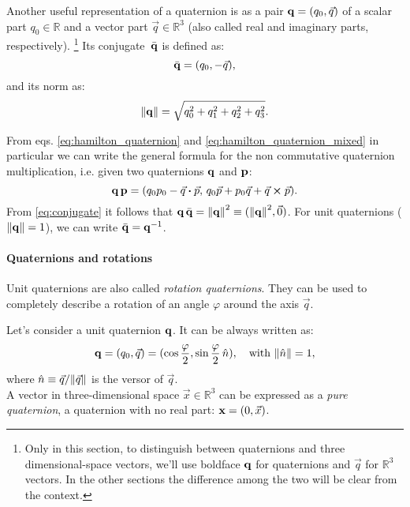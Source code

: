 Another useful representation of a quaternion is as a pair $\mathbf{q} = (q_0, \vec q)$ of a scalar part $q_0\in \mathbb{R}$ and a vector part $\vec q \in \mathbb{R}^3$ (also called real and imaginary parts, respectively).
\footnote{Only in this section, to distinguish between quaternions and three dimensional-space vectors, we'll use boldface $\mathbf{q}$ for quaternions and $\vec q$ for $\mathbb{R}^3$ vectors. In the other sections the difference among the two will be clear from the context.}
Its conjugate~$\bar{\mathbf{q}}$ is defined as:
\begin{equation}
 \bar{\mathbf{q}} = (q_0, -\vec q),
 \label{eq:conjugate}
\end{equation}
and its norm as:
\begin{equation}
 \norm{\mathbf{q}} = \sqrt{q_0^2+q_1^2+q_2^2+q_3^2}.
\end{equation}

From eqs. \eqref{eq:hamilton_quaternion} and \eqref{eq:hamilton_quaternion_mixed} in particular we can write the general formula for the non commutative quaternion multiplication, i.e. given two quaternions $\mathbf{q}$ and $\mathbf{p}$:
\begin{equation}
 \quat{q} \,\quat{p} = (q_0 p_0 - \vec q \vdot \vec p, \, q_0 \vec p + p_0 \vec q + \vec q \cross \vec p).
 \label{eq:quaternion_multiplication}
\end{equation}
From \eqref{eq:conjugate} it follows that $\mathbf{q} \,\bar{\mathbf{q}} = \norm{\mathbf{q}}^2 \equiv (\norm{\mathbf{q}}^2, \vec 0)$. For unit quaternions ($\norm{\mathbf{q}} = 1$), we can write $\bar{\mathbf{q}} = \mathbf{q}^{-1}$.%

\paragraph{Quaternions and rotations} Unit quaternions are also called \emph{rotation quaternions}.
They can be used to completely describe a rotation of an angle $\varphi$ around the axis $\vec q$.

Let's consider a unit quaternion $\mathbf{q}$. It can be always written as:
\begin{equation}
 \mathbf{q} = (q_0, \vec q) = (\cos \frac \varphi 2, \sin \frac \varphi 2\, \hat n), \quad \text{with } \norm{\hat n}=1,
\end{equation}
where $\hat n \equiv \vec q/\norm{\vec q}$ is the versor of $\vec q$.\\
A vector in three-dimensional space $\vec x \in \mathbb R^3$ can be expressed as a \emph{pure quaternion}, a quaternion with no real part: $\boldsymbol{\mathbf{x}} = (0, \vec x)$.

